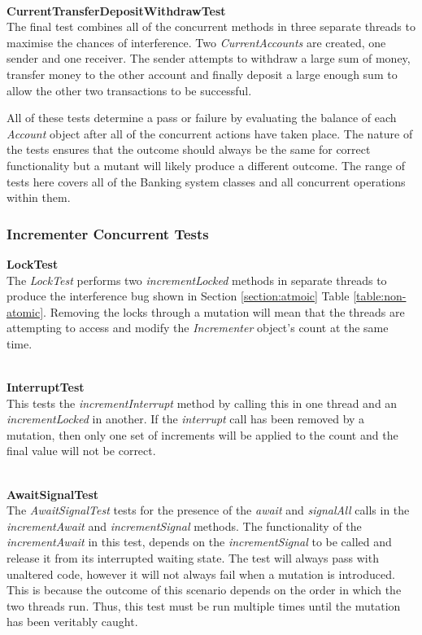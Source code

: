 \documentclass[a4paper,12pt]{article}
\begin{document}
\textbf{\\CurrentTransferDepositWithdrawTest}
\\The final test combines all of the concurrent methods in three separate threads to maximise the chances of interference. Two \textit{CurrentAccounts} are created, one sender and one receiver. The sender attempts to withdraw a large sum of money, transfer money to the other account and finally deposit a large enough sum to allow the other two transactions to be successful.  

All of these tests determine a pass or failure by evaluating the balance of each \textit{Account} object after all of the concurrent actions have taken place. The nature of the tests ensures that the outcome should always be the same for correct functionality but a mutant will likely produce a different outcome. The range of tests here covers all of the Banking system classes and all concurrent operations within them.

\subsubsection{Incrementer Concurrent Tests}

\textbf{LockTest}
\\The \textit{LockTest} performs two \textit{incrementLocked} methods in separate threads to produce the interference bug shown in Section \ref{section:atmoic} Table \ref{table:non-atomic}. Removing the locks through a mutation will mean that the threads are attempting to access and modify the \textit{Incrementer} object's count at the same time. 

\textbf{\\InterruptTest}
\\This tests the \textit{incrementInterrupt} method by calling this in one thread and an \textit{incrementLocked} in another. If the \textit{interrupt} call has been removed by a mutation, then only one set of increments will be applied to the count and the final value will not be correct. 

\textbf{\\AwaitSignalTest}
\\The \textit{AwaitSignalTest} tests for the presence of the \textit{await} and \textit{signalAll} calls in the \textit{incrementAwait} and \textit{incrementSignal} methods. The functionality of the \textit{incrementAwait} in this test, depends on the \textit{incrementSignal} to be called and release it from its interrupted waiting state. The test will always pass with unaltered code, however it will not always fail when a mutation is introduced. This is because the outcome of this scenario depends on the order in which the two threads run. Thus, this test must be run multiple times until the mutation has been veritably caught. 
\end{document}
